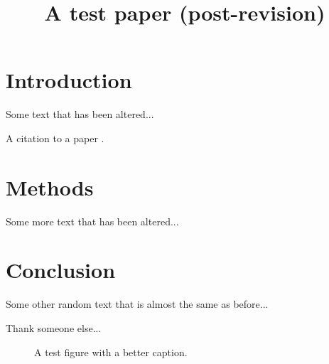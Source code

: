 \documentclass{ametsoc}
\title{A test paper (post-revision)}
\affiliation{Some New (Better) Affiliation}
\begin{document}
\maketitle

%
%

\section{Introduction}\label{Introduction}

Some text that has been altered...

A citation to a paper \citep{Gregg2003}.

\section{Methods}

Some more text that has been altered...

\section{Conclusion}

Some other random text that is almost the same as before...

%
\acknowledgments

Thank someone else...






\begin{figure}
  \caption{A test figure with a better caption.}
\label{}
\end{figure}
\end{document}
